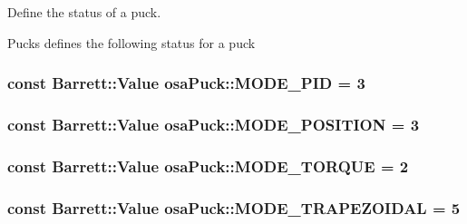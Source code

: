 Define the status of a puck. 

Pucks defines the following status for a puck \hypertarget{classosa_puck_a60ac2cf88c6c517f01db4569843a5e1a}{
\subsubsection[{M\-O\-D\-E\-\_\-\-P\-I\-D}]{\setlength{\rightskip}{0pt plus 5cm}const {\bf Barrett\-::\-Value} osa\-Puck\-::\-M\-O\-D\-E\-\_\-\-P\-I\-D = 3\hspace{0.3cm}{\ttfamily [static]}}}\label{classosa_puck_a60ac2cf88c6c517f01db4569843a5e1a}
\hypertarget{classosa_puck_a7bbba0c7e8896c0d8b6da42f60d7ec0d}{
\subsubsection[{M\-O\-D\-E\-\_\-\-P\-O\-S\-I\-T\-I\-O\-N}]{\setlength{\rightskip}{0pt plus 5cm}const {\bf Barrett\-::\-Value} osa\-Puck\-::\-M\-O\-D\-E\-\_\-\-P\-O\-S\-I\-T\-I\-O\-N = 3\hspace{0.3cm}{\ttfamily [static]}}}\label{classosa_puck_a7bbba0c7e8896c0d8b6da42f60d7ec0d}
\hypertarget{classosa_puck_aabdc001b07826137272fb01ffb200aac}{
\subsubsection[{M\-O\-D\-E\-\_\-\-T\-O\-R\-Q\-U\-E}]{\setlength{\rightskip}{0pt plus 5cm}const {\bf Barrett\-::\-Value} osa\-Puck\-::\-M\-O\-D\-E\-\_\-\-T\-O\-R\-Q\-U\-E = 2\hspace{0.3cm}{\ttfamily [static]}}}\label{classosa_puck_aabdc001b07826137272fb01ffb200aac}
\hypertarget{classosa_puck_ae59c70fb0ca441fbbce58a50539c7b36}{
\subsubsection[{M\-O\-D\-E\-\_\-\-T\-R\-A\-P\-E\-Z\-O\-I\-D\-A\-L}]{\setlength{\rightskip}{0pt plus 5cm}const {\bf Barrett\-::\-Value} osa\-Puck\-::\-M\-O\-D\-E\-\_\-\-T\-R\-A\-P\-E\-Z\-O\-I\-D\-A\-L = 5\hspace{0.3cm}{\ttfamily [static]}}}\label{classosa_puck_ae59c70fb0ca441fbbce58a50539c7b36}

